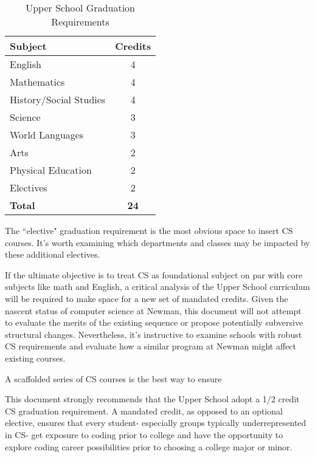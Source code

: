\begin{table}
	\begin{center}
\begin{tabular}{ | l | c | }
	
	\hline
	\textbf{Subject} & \textbf{Credits} \\ \hline
	English & 4 \\ \hline
	Mathematics & 4 \\ \hline
	History/Social Studies & 4 \\ \hline
	Science & 3 \\ \hline
	World Languages & 3 \\ \hline
	Arts & 2 \\ \hline
	Physical Education & 2 \\ \hline
	Electives & 2 \\ \hline
	\textbf{Total} & \textbf{24} \\ \hline
\end{tabular} 
\caption{Upper School Graduation Requirements} \label{tab:usreqs} 
\end{center}
\end{table}
\par
The ``elective" graduation requirement is the most obvious space to insert CS courses. It's worth examining which departments and classes may be impacted by these additional electives.\par
If the ultimate objective is to treat CS as foundational subject on par with core subjects like math and English, a critical analysis of the Upper School curriculum will be required to make space for a new set of mandated credits. Given the nascent status of computer science at Newman, this document will not attempt to evaluate the merits of the existing sequence or propose potentially subversive structural changes. Nevertheless, it's instructive to examine schools with robust CS requirements and evaluate how a similar program at Newman might affect existing courses.\par





A scaffolded series of CS courses is the best way to ensure 

 \par
This document strongly recommends that the Upper School adopt a 1/2 credit CS graduation requirement. A mandated credit, as opposed to an optional elective, ensures that every student- especially groups typically underrepresented in CS- get exposure to coding prior to college and have the opportunity to explore coding career possibilities prior to choosing a college major or minor. \par


